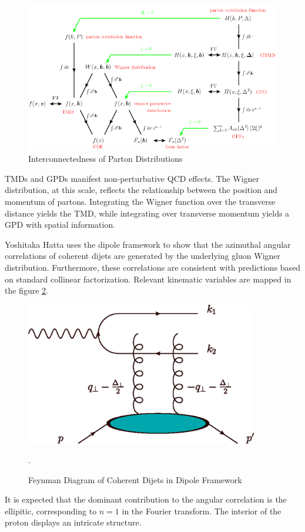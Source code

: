 \begin{figure}[h!]
\begin{centering}
\includegraphics[width=7in]{Chapter1/importfigs/fig6_introGPD_TMD.png}
\par\end{centering}
\caption{Interconnectedness of Parton Distributions \cite{Diehl:2003ny} \label{fig:gpdTMDWeb}}
\end{figure}

TMDs and GPDs manifest non-perturbative QCD effects. The Wigner distribution, at this scale, reflects the relationship between the position and momentum of partons. Integrating the Wigner function over the transverse distance yields the TMD, while integrating over transverse momentum yields a GPD with spatial information. 

Yoshitaka Hatta uses the dipole framework to show that the azimuthal angular correlations of coherent dijets are generated by the underlying gluon Wigner distribution. Furthermore, these correlations are consistent with predictions based on standard collinear factorization. Relevant kinematic variables are mapped in the figure \ref{fig:yatta1}.

\begin{figure}[h!]
\begin{centering}
\includegraphics[width=4in]{Chapter1/importfigs/fig4_yatta.png}
\par\end{centering}
\caption{Feynman Diagram of Coherent Dijets in Dipole Framework \cite{Hatta:2016dxp}\label{fig:yatta1}}.
\end{figure}

It is expected that the dominant contribution to the angular correlation is the ellipitic, corresponding to $n=1$ in the Fourier transform. The interior of the proton displays an intricate structure. 